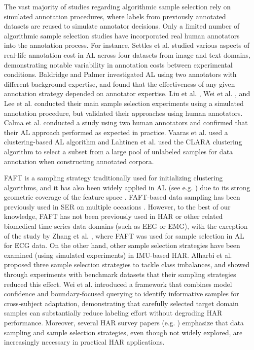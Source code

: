 \documentclass[a4paper,fleqn]{cas-dc}
\begin{document}
The vast majority of studies regarding algorithmic sample selection rely on simulated annotation procedures, where labels from previously annotated datasets are reused to simulate annotator decisions. Only a limited number of algorithmic sample selection studies have incorporated real human annotators into the annotation process. For instance, Settles et al. \cite{settles_al_with_real_annotation_costs} studied various aspects of real-life annotation cost in AL across four datasets from image and text domains, demonstrating notable variability in annotation costs between experimental conditions. Baldridge and Palmer \cite{al_two_annotators_different_expertise} investigated AL using two annotators with different background expertise, and found that the effectiveness of any given annotation strategy depended on annotator expertise. Liu et al. \cite{al_human_pose_estimation}, Wei et al. \cite{cost_aware_al_clinical_text}, and Lee et al. \cite{annotation_curricula} conducted their main sample selection experiments using a simulated annotation procedure, but validated their approaches using human annotators. Calma et al. \cite{al_with_realistic_data_case_study} conducted a study using two human annotators and confirmed that their AL approach performed as expected in practice. Vaaras et al. \cite{nicu_a_speechcomm} used a clustering-based AL algorithm and Lahtinen et al. \cite{finnaffect_speechcomm} used the CLARA clustering algorithm to select a subset from a large pool of unlabeled samples for data annotation when constructing annotated corpora.

FAFT is a sampling strategy traditionally used for initializing clustering algorithms, and it has also been widely applied in AL (see e.g. \cite{al_text_datasets, mal_paper, al_cnn_coreset, al_sed}) due to its strong geometric coverage of the feature space \cite{faft_original_gonzalez, clustering_without_over_representation}. FAFT-based data sampling has been previously used in SER on multiple occasions \cite{nicu_a_speechcomm, vaaras22_interspeech, lahtinen25_interspeech}. However, to the best of our knowledge, FAFT has not been previously used in HAR or other related biomedical time-series data domains (such as EEG or EMG), with the exception of the study by Zhang et al. \cite{faft_al_ecg}, where FAFT was used for sample selection in AL for ECG data. On the other hand, other sample selection strategies have been examined (using simulated experiments) in IMU-based HAR. Alharbi et al. \cite{sampling_strategy_comparison_har_imbalanced_data} proposed three sample selection strategies to tackle class imbalances, and showed through experiments with benchmark datasets that their sampling strategies reduced this effect. Wei et al. \cite{activeselfhar} introduced a framework that combines model confidence and boundary‑focused querying to identify informative samples for cross‑subject adaptation, demonstrating that carefully selected target domain samples can substantially reduce labeling effort without degrading HAR performance. Moreover, several HAR survey papers (e.g. \cite{HAR_tutorial, recent_trends_in_ml_for_har_survey, leveraging_al_in_har, transfer_learning_har_survey}) emphasize that data sampling and sample selection strategies, even though not widely explored, are increasingly necessary in practical HAR applications.
\end{document}
